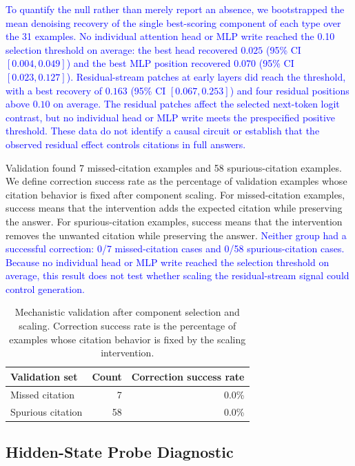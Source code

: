 \documentclass[a4paper,fleqn]{cas-sc}
\begin{document}
\textcolor{blue}{To quantify the null rather than merely report an absence, we bootstrapped the mean denoising recovery of the single best-scoring component of each type over the 31 examples. No individual attention head or MLP write reached the 0.10 selection threshold on average: the best head recovered $0.025$ (95\% CI $[0.004, 0.049]$) and the best MLP position recovered $0.070$ (95\% CI $[0.023, 0.127]$). Residual-stream patches at early layers did reach the threshold, with a best recovery of $0.163$ (95\% CI $[0.067, 0.253]$) and four residual positions above $0.10$ on average. The residual patches affect the selected next-token logit contrast, but no individual head or MLP write meets the prespecified positive threshold. These data do not identify a causal circuit or establish that the observed residual effect controls citations in full answers.}

Validation found 7 missed-citation examples and 58 spurious-citation examples. We define correction success rate as the percentage of validation examples whose citation behavior is fixed after component scaling. For missed-citation examples, success means that the intervention adds the expected citation while preserving the answer. For spurious-citation examples, success means that the intervention removes the unwanted citation while preserving the answer. \textcolor{blue}{Neither group had a successful correction: 0/7 missed-citation cases and 0/58 spurious-citation cases. Because no individual head or MLP write reached the selection threshold on average, this result does not test whether scaling the residual-stream signal could control generation.}

\begin{table}[t]
\centering
\small
\begin{tabular}{lrr}
\toprule
Validation set & Count & Correction success rate \\
\midrule
Missed citation & 7 & 0.0\% \\
Spurious citation & 58 & 0.0\% \\
\bottomrule
\end{tabular}
\caption{Mechanistic validation after component selection and scaling. Correction success rate is the percentage of examples whose citation behavior is fixed by the scaling intervention.}
\label{tab:mechanistic-validation}
\end{table}

\subsection{Hidden-State Probe Diagnostic}
\end{document}
